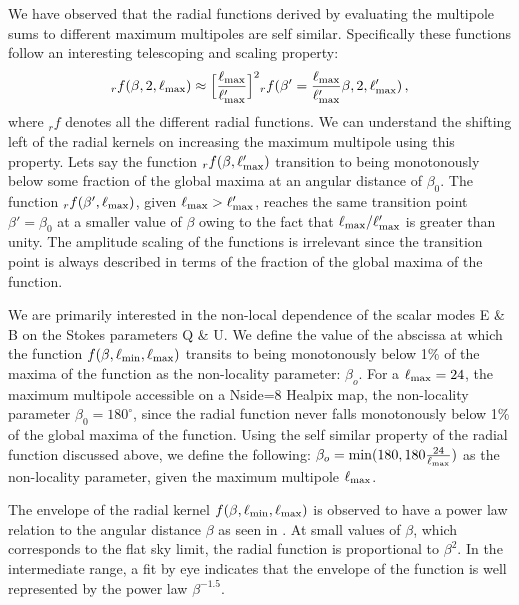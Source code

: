 We have observed that the radial functions derived by evaluating the multipole sums to different maximum multipoles are self similar. Specifically these functions follow an interesting telescoping and scaling property: $${}_rf(\beta,2,\ell_{\rm max}) \approx \Big[\frac{\ell_{\rm max}}{\ell'_{\rm max}}\Big]^2{}_rf(\beta'=\frac{\ell_{\rm max}}{\ell'_{\rm max}} \beta ,2,\ell'_{\rm max}) \,,$$ where ${}_rf$ denotes all the different radial functions. We can understand the shifting left of the radial kernels on increasing the maximum multipole using this property. Lets say the function ${}_rf(\beta, \ell'_{\rm max})$ transition to being monotonously below some fraction of the global maxima at an angular distance of $\beta_0$.  The function ${}_rf(\beta', \ell_{\rm max})$, given $\ell_{\rm max} > \ell'_{\rm max}$, reaches the same transition point $\beta'=\beta_0$ at a smaller value of $\beta$ owing to the fact that $\ell_{\rm max}/\ell'_{\rm max}$ is greater than unity. The amplitude scaling of the functions is irrelevant since the transition point is always described in terms of the fraction of the global maxima of the function.

We are primarily interested in the non-local dependence of the scalar modes E \& B on the Stokes parameters Q \& U. We define the value of the abscissa at which the function $f(\beta,\ell_{\rm min},\ell_{\rm max})$ transits to being monotonously below 1\% of the maxima of the function as the non-locality parameter: $\beta_{o}$.  For a $\ell_{\rm max}=24$, the maximum multipole accessible on a Nside=8 Healpix map, the non-locality parameter $\beta_0=180^{\circ}$, since the radial function never falls monotonously below 1\% of the global maxima of the function. Using the self similar  property of the radial function discussed above, we define the following: $\beta_o= {\rm min}(180,180 \frac{24}{\ell_{\rm max}})$ as the non-locality parameter, given the maximum multipole $\ell_{\rm max}$.  

The envelope of the radial kernel $f(\beta,\ell_{\rm min},\ell_{\rm max})$ is observed to have a power law relation to the angular distance $\beta$ as seen in . At small values of $\beta$, which corresponds to the flat sky limit,  the radial function is proportional to $\beta^2$. In the intermediate range,  a fit by eye indicates that the envelope of the function is well represented by the power law $\beta^{-1.5}$.
